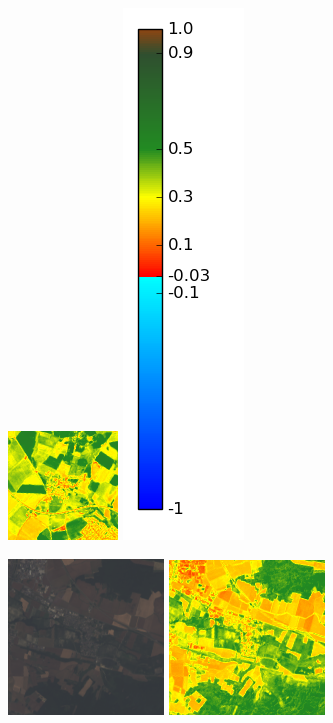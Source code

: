 \documentclass{book}
\begin{document}
\begin{figure}[H]
{\includegraphics[scale=1.1]{images/Fontenay-en-Parisis/07_ndvi.png}
\includegraphics[scale=0.3]{images/colormap.png}
}
\centerline{
\includegraphics[scale=1.1]{images/Malay-le-Grand/07_rgb.png}
\includegraphics[scale=1.1]{images/Malay-le-Grand/07_ndvi.png}
}
\end{figure}
\end{document}
